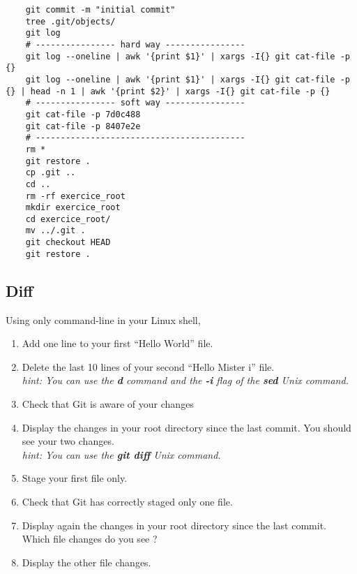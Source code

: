 \ifdefined\answer
\begin{verbatim}
    git commit -m "initial commit"
    tree .git/objects/
    git log
    # ---------------- hard way ----------------
    git log --oneline | awk '{print $1}' | xargs -I{} git cat-file -p {}
    git log --oneline | awk '{print $1}' | xargs -I{} git cat-file -p {} | head -n 1 | awk '{print $2}' | xargs -I{} git cat-file -p {}
    # ---------------- soft way ----------------
    git cat-file -p 7d0c488
    git cat-file -p 8407e2e
    # ------------------------------------------
    rm *
    git restore .
    cp .git ..
    cd ..
    rm -rf exercice_root
    mkdir exercice_root
    cd exercice_root/
    mv ../.git .
    git checkout HEAD
    git restore .
\end{verbatim}
\fi

\subsection{Diff}  %

Using only command-line in your Linux shell,
\begin{enumerate}
    \item Add one line to your first ``Hello World'' file.
    \item Delete the last 10 lines of your second ``Hello Mister i'' file. \\
        \textit{hint: You can use the \textbf{d} command and the \textbf{-i} flag of the \textbf{sed} Unix command.}
    \item Check that Git is aware of your changes
    \item Display the changes in your root directory since the last commit.
          You should see your two changes. \\
        \textit{hint: You can use the \textbf{git diff} Unix command.}
    \item Stage your first file only.
    \item Check that Git has correctly staged only one file.
    \item Display again the changes in your root directory since the last commit.
          Which file changes do you see ?
    \item Display the other file changes.
\end{enumerate}

